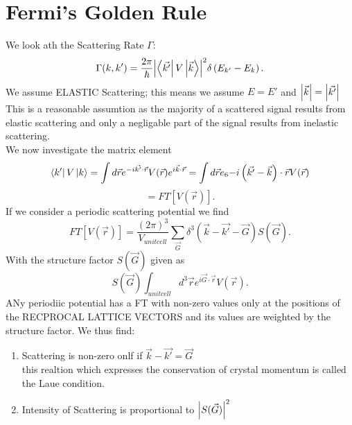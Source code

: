 \documentclass{report}
\begin{document}
\section{Fermi's Golden Rule}
We look ath the Scattering Rate $\Gamma$: \[
	\Gamma(k, k') = \frac{2\pi}{\hbar} \abs{\bra{\vec{k'}} V \ket{\vec{k}} }^2 \delta\left( E_{k'} - E_k \right)  
.\] 
We assume ELASTIC Scattering; this means we assume $E =E'$ and $\abs{\vec{k}} = \abs{\vec{k'}}$ \\
This is a reasonable assumtion as the majority of a scattered signal results from elastic scattering and only a negligable part of the signal results from inelastic scattering.\\
We now investigate the matrix element  \[
	\bra{k'} V \ket{k} = \int d\vec{r} e^{-i \vec{k'} \cdot \vec{r}} V(\vec{r}) e^{i \vec{k}\cdot\vec{r}} = \int d\vec{r} e_6{-i\left( \vec{k'} - \vec{k} \right) \cdot \vec{r}} V(\vec{r})
\] \[
= FT[V(\vec{r})]
.\]  
If we consider a periodic scattering potential we find \[
	FT[V(\vec{r})] = \frac{\left( 2\pi \right) ^3}{V_{unit cell}} \sum_{\vec{G}} \delta^3\left( \vec{k} - \vec{k'} - \vec{G} \right) S\left( \vec{G} \right) 	
.\] With the structure factor $S(\vec{G})$ given as \[
S(\vec{G})  \int_{unit cell} d^3\vec{r} e^{i \vec{G} \cdot \vec{r}} V(\vec{r})
.\] ANy periodiic potential has a FT with non-zero values only at the positions of the RECPROCAL LATTICE VECTORS and its values are weighted by the structure factor. We thus find:
\begin{enumerate}
	\item Scattering is non-zero onlf if $\vec{k} - \vec{k'} = \vec{G}$ \\
		this realtion which expresses the conservation of crystal momentum is called the Laue condition.
	\item Intensity of Scattering is proportional to $\abs{S(\vec{G})}^2$
\end{enumerate}
\end{document}
